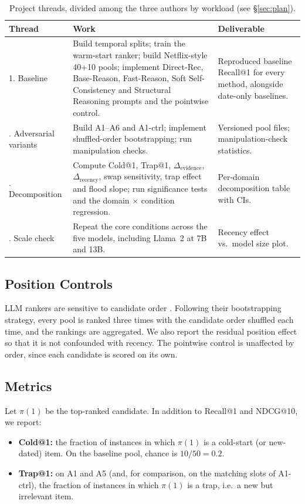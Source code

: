 \documentclass[11pt]{article}
\begin{document}
\begin{table}[t]
\centering
\small
\begin{tabularx}{\textwidth}{@{}l X X@{}}
\toprule
\textbf{Thread} & \textbf{Work} & \textbf{Deliverable} \\
\midrule
1. Baseline &
Build temporal splits; train the warm-start ranker; build Netflix-style 40+10 pools; implement Direct-Rec, Base-Reason, Fast-Reason, Soft Self-Consistency and Structural Reasoning prompts and the pointwise control. &
Reproduced baseline Recall@1 for every method, alongside date-only baselines. \\
\addlinespace
2. Adversarial variants &
Build A1--A6 and A1-ctrl; implement shuffled-order bootstrapping; run manipulation checks. &
Versioned pool files; manipulation-check statistics. \\
\addlinespace
3. Decomposition &
Compute Cold@1, Trap@1, $\Delta_{\text{evidence}}$, $\Delta_{\text{recency}}$, swap sensitivity, trap effect and flood slope; run significance tests and the domain $\times$ condition regression. &
Per-domain decomposition table with CIs. \\
\addlinespace
4. Scale check &
Repeat the core conditions across the five models, including Llama~2 at 7B and 13B. &
Recency effect vs.\ model size plot. \\
\bottomrule
\end{tabularx}
\caption{Project threads, divided among the three authors by workload (see \S\ref{sec:plan}).}\label{tab:plan}
\end{table}

\subsection{Position Controls}
LLM rankers are sensitive to candidate order \citep{hou2024llmrank}. Following their bootstrapping strategy, every pool is ranked three times with the candidate order shuffled each time, and the rankings are aggregated. We also report the residual position effect so that it is not confounded with recency. The pointwise control is unaffected by order, since each candidate is scored on its own.

\subsection{Metrics}
Let $\pi(1)$ be the top-ranked candidate. In addition to Recall@1 and NDCG@10, we report:
\begin{itemize}
  \item \textbf{Cold@1:} the fraction of instances in which $\pi(1)$ is a cold-start (or new-dated) item. On the baseline pool, chance is $10/50 = 0.2$.
  \item \textbf{Trap@1:} on A1 and A5 (and, for comparison, on the matching slots of A1-ctrl), the fraction of instances in which $\pi(1)$ is a trap, i.e.\ a new but irrelevant item.
\end{itemize}
\end{document}
